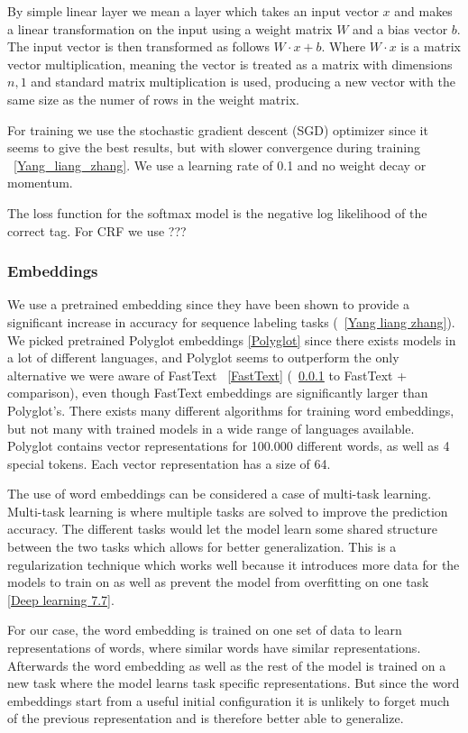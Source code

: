 By simple linear layer we mean a layer which takes an input vector $x$ and makes
a linear transformation on the input using a weight matrix $W$ and a bias vector
$b$. The input vector is then transformed as follows $W \cdot x + b$. Where $W
\cdot x$ is a matrix vector multiplication, meaning the vector is treated as a
matrix with dimensions $n,1$ and standard matrix multiplication is used,
producing a new vector with the same size as the numer of rows in the weight
matrix.

For training we use the stochastic gradient descent (SGD) optimizer since it
seems to give the best results, but with slower convergence during training
~\ref{Yang_liang_zhang}. We use a learning rate of 0.1 and no weight decay or
momentum.

The loss function for the softmax model is the negative log likelihood of the
correct tag. For CRF we use ???

\subsubsection{Embeddings}

We use a pretrained embedding since they have been shown to provide a
significant increase in accuracy for sequence labeling tasks (~\ref{Yang liang
zhang}). We picked pretrained Polyglot embeddings \ref{Polyglot} since there
exists models in a lot of different languages, and Polyglot seems to outperform
the only alternative we were aware of FastText ~\ref{FastText} (~\ref{} to
FastText + comparison), even though FastText embeddings are significantly larger
than Polyglot's. There exists many different algorithms for training word
embeddings, but not many with trained models in a wide range of languages
available. Polyglot contains vector representations for 100.000 different words,
as well as 4 special tokens. Each vector representation has a size of 64.

The use of word embeddings can be considered a case of multi-task learning.
Multi-task learning is where multiple tasks are solved to improve the prediction
accuracy. The different tasks would let the model learn some shared structure
between the two tasks which allows for better generalization. This is a
regularization technique which works well because it introduces more data for
the models to train on as well as prevent the model from overfitting on one task
\ref{Deep learning 7.7}. 

For our case, the word embedding is trained on one set of data to learn
representations of words, where similar words have similar representations.
Afterwards the word embedding as well as the rest of the model is trained on a
new task where the model learns task specific representations. But since the
word embeddings start from a useful initial configuration it is unlikely to
forget much of the previous representation and is therefore better able to
generalize.

